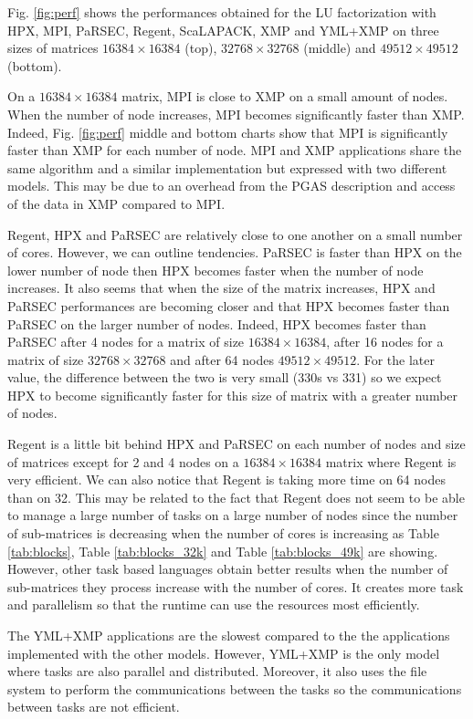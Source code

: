 Fig. \ref{fig:perf} shows the performances obtained for the LU factorization with HPX, MPI, PaRSEC, Regent, ScaLAPACK, XMP and YML+XMP on three sizes of matrices $16384 \times 16384$ (top), $32768 \times 32768$ (middle) and $49512 \times 49512$ (bottom).

On a $16384 \times 16384$ matrix, MPI is close to XMP on a small amount of nodes.
When the number of node increases, MPI becomes significantly faster than XMP.
Indeed, Fig. \ref{fig:perf} middle and bottom charts show that MPI is significantly faster than XMP for each number of node.
MPI and XMP applications share the same algorithm and a similar implementation but expressed with two different models.
This may be due to an overhead from the PGAS description and access of the data in XMP compared to MPI.

Regent, HPX and PaRSEC are relatively close to one another on a small number of cores.
However, we can outline tendencies.
PaRSEC is faster than HPX on the lower number of node then HPX becomes faster when the number of node increases.
It also seems that when the size of the matrix increases, HPX and PaRSEC performances are becoming closer and that HPX becomes faster than PaRSEC on the larger number of nodes.
Indeed, HPX becomes faster than PaRSEC after 4 nodes for a  matrix of size $16384 \times 16384$, after 16 nodes for a matrix of size $32768 \times 32768$ and after 64 nodes $49512 \times 49512$.
For the later value, the difference between the two is very small (330s vs 331) so we expect HPX to become significantly faster for this size of matrix with a greater number of nodes.

Regent is a little bit behind HPX and PaRSEC on each number of nodes and size of matrices except for 2 and 4 nodes on a $16384 \times 16384$ matrix where Regent is very efficient.
We can also notice that Regent is taking more time on 64 nodes than on 32.
This may be related to the fact that Regent does not seem to be able to manage a large number of tasks on a large number of nodes since the number of sub-matrices is decreasing when the number of cores is increasing as Table \ref{tab:blocks}, Table \ref{tab:blocks_32k} and Table \ref{tab:blocks_49k} are showing.
However, other task based languages obtain better results when the number of sub-matrices they process increase with the number of cores.
It creates more task and parallelism so that the runtime can use the resources most efficiently.

The YML+XMP applications are the slowest compared to the the applications implemented with the other models.
However, YML+XMP is the only model where tasks are also parallel and distributed.
Moreover, it also uses the file system to perform the communications between the tasks so the communications between tasks are not efficient.

